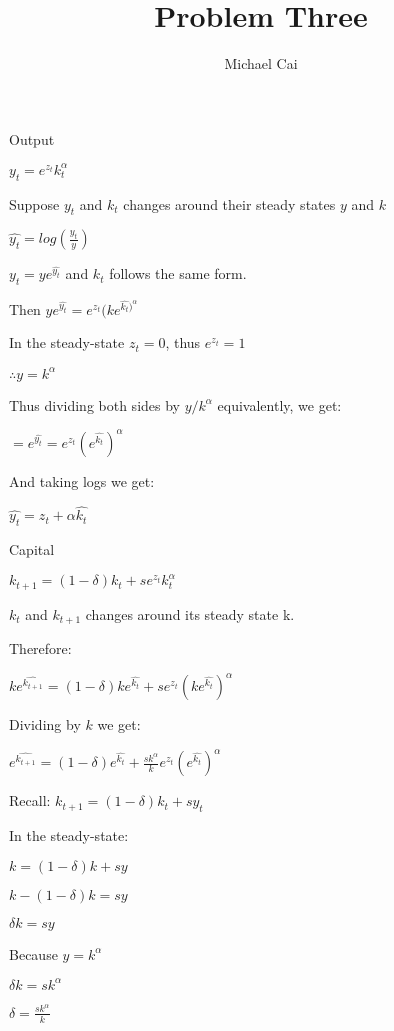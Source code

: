 \documentclass[11pt, oneside]{article}   	%
\title{Problem Three}
\author{Michael Cai}
\begin{document}
\maketitle
\section{}
Output

$y_t = e^{z_t}k_t^\alpha$

Suppose $y_t$ and $k_t$ changes around their steady states $y$ and $k$

$\hat{y_t} = log(\frac{y_t}{y})$ 

$y_t = ye^{\hat{y_t}}$ and $k_t$ follows the same form.

Then $ye^{\hat{y_t}} = e^{z_t}(ke^{{\hat{k_t}})^{\alpha}}$

In the steady-state $z_t = 0$, thus $e^{z_t} = 1$

$\therefore y = k^\alpha$

Thus dividing both sides by $y/k^\alpha$ equivalently, we get:

$= e^{\hat{y_t}} = e^{z_t}(e^{\hat{k_t}})^\alpha$

And taking logs we get:

$\hat{y_t} = z_t + \alpha \hat{k_t}$

Capital

$k_{t+1} = (1-\delta)k_t + se^{z_t} k_t^\alpha$

$k_t$ and $k_{t+1}$ changes around its steady state k.

Therefore:

$ke^{\widehat{k_{t+1}}} = (1-\delta)ke^{\hat{k_t}} + se^{z_t} (ke^{\hat{k_t}})^\alpha$

Dividing by $k$ we get:

$e^{\widehat{k_{t+1}}} = (1-\delta)e^{\hat{k_t}} + \frac{sk^\alpha}{k}e^{z_t}(e^{\hat{k_t}})^\alpha$

Recall: $k_{t+1} = (1-\delta)k_t + sy_t$

In the steady-state: 

$k = (1-\delta)k + sy$

$k - (1-\delta)k = sy$

$\delta k = sy$

Because $y = k^\alpha$

$\delta k = sk^\alpha$

$\delta = \frac{sk^\alpha}{k}$
\end{document}

